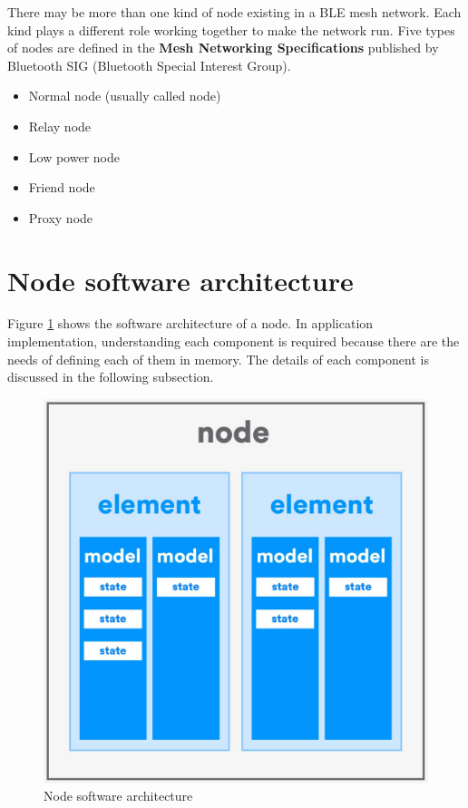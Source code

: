 \documentclass[../../main.tex]{subfiles}
\begin{document}
There may be more than one kind of node existing in a BLE mesh network. Each kind plays a different role working together to make the network run. Five types of nodes are defined in the \textbf{Mesh Networking Specifications} published by Bluetooth SIG (Bluetooth Special Interest Group).
\begin{itemize}
    \item Normal node (usually called node)
    \item Relay node
    \item Low power node
    \item Friend node
    \item Proxy node
\end{itemize}
\section{Node software architecture}
Figure \ref{fig:Node software architecture} shows the software architecture of a node. In application implementation, understanding each component is required because there are the needs of defining each of them in memory. The details of each component is discussed in the following subsection.
\begin{figure}[ht]
    \begin{center}
        \includegraphics[scale=0.2]{node_software_architecture.jpg}
    \end{center}
    \caption{Node software architecture}
    \label{fig:Node software architecture}
\end{figure}
\end{document}
